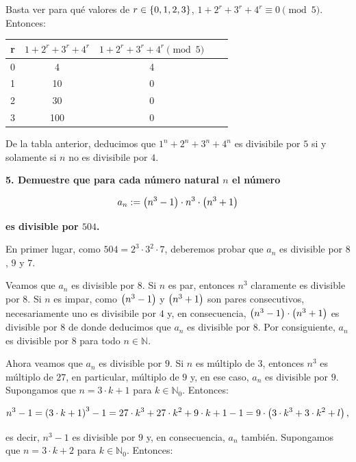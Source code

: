 Basta ver para qué valores de $r\in\left\{0,1,2,3\right\}$, $1+2^r+3^r+4^r\equiv 0\pmod{5}$. Entonces:

\begin{center}
  \begin{tabular}{|c|c|c|c|c|} %
    \hline %
    r & $1+2^r+3^r+4^r$ & $1+2^r+3^r+4^r\pmod{5}$\\\hline %
    0 & 4 & 4 \\
    1 & 10 & 0 \\
    2 & 30 & 0 \\
    3 & 100 & 0 \\\hline %
  \end{tabular}
\end{center}

De la tabla anterior, deducimos que $1^n+2^n+3^n+4^n$ es divisibile por $5$ si y solamente si $n$ no es divisibile por $4$.

\textbf{5. Demuestre que para cada número natural $n$ el número}

\begin{equation*}
  a_n:=\left(n^3-1\right)\cdot n^3\cdot\left(n^3+1\right)
\end{equation*}

\textbf{es divisible por $504$.}

En primer lugar, como $504=2^3\cdot 3^2\cdot 7$, deberemos probar que $a_n$ es divisible por $8$, $9$ y $7$. 

Veamos que $a_n$ es divisible por $8$. Si $n$ es par, entonces $n^3$ claramente es divisible por $8$. Si $n$ es impar, como $\left(n^3-1\right)$ y $\left(n^3+1\right)$ son pares consecutivos, necesariamente uno es divisibile por $4$ y, en consecuencia, $\left(n^3-1\right)\cdot\left(n^3+1\right)$ es divisible por $8$ de donde deducimos que $a_n$ es divisible por $8$. Por consiguiente, $a_n$ es divisible por $8$ para todo $n\in\mathbb{N}$.

Ahora veamos que $a_n$ es divisible por $9$. Si $n$ es múltiplo de $3$, entonces $n^3$ es múltiplo de $27$, en particular, múltiplo de $9$ y, en ese caso, $a_n$ es divisible por $9$. Supongamos que $n=3\cdot k+1$ para $k\in\mathbb{N}_0$. Entonces:

\begin{equation}
  n^3-1=\left(3\cdot k+1\right)^3-1=27\cdot k^3+27\cdot k^2+9\cdot k+1-1=9\cdot\left(3\cdot k^3+3\cdot k^2+l\right),
\end{equation}

es decir, $n^3-1$ es divisible por $9$ y, en consecuencia, $a_n$ también. Supongamos que $n=3\cdot k+2$ para $k\in\mathbb{N}_0$. Entonces:


